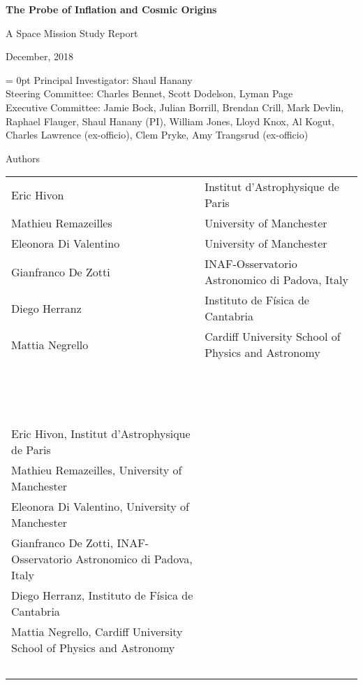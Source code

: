 \documentclass[PICOReport.tex]{subfiles}
\begin{document}

\LARGE{ \centerline{\bf{The Probe of Inflation and Cosmic Origins}}}
\vspace{0.5in}
\Large{ \centerline{A Space Mission Study Report}}
\Large{ \centerline{December, 2018 }}
\vspace{0.5in}
\parindent = 0pt
\normalsize{Principal Investigator: Shaul Hanany} \\
\normalsize{Steering Committee: Charles Bennet, Scott Dodelson, Lyman Page } \\
\normalsize{Executive Committee:  Jamie Bock, Julian Borrill, Brendan Crill, Mark Devlin, Raphael Flauger, Shaul Hanany (PI), William Jones, Lloyd Knox, Al Kogut, Charles Lawrence (ex-officio), Clem Pryke, Amy Trangsrud (ex-officio)} \\

\Large  {\centerline {Authors}}

\small {


\begin{tabular}{@{}ll@{}}
Eric Hivon             &  Institut d'Astrophysique de Paris\\
Mathieu Remazeilles    &  University of Manchester\\
Eleonora Di Valentino  &  University of Manchester\\
Gianfranco De Zotti    &  INAF-Osservatorio Astronomico di Padova, Italy\\
Diego Herranz          &  Instituto de Física de Cantabria\\
Mattia Negrello        &   Cardiff University School of Physics and Astronomy\\
~&~\\
~&~\\
~&~\\
Eric Hivon,  		  Institut d'Astrophysique de Paris\\
Mathieu Remazeilles,	  University of Manchester\\
Eleonora Di Valentino, 	  University of Manchester\\
Gianfranco De Zotti,  	  INAF-Osservatorio Astronomico di Padova, Italy\\
Diego Herranz,  	  Instituto de Física de Cantabria\\
Mattia Negrello,  	  Cardiff University School of Physics and Astronomy \\
~\\

\end{tabular}
}
\end{document}
